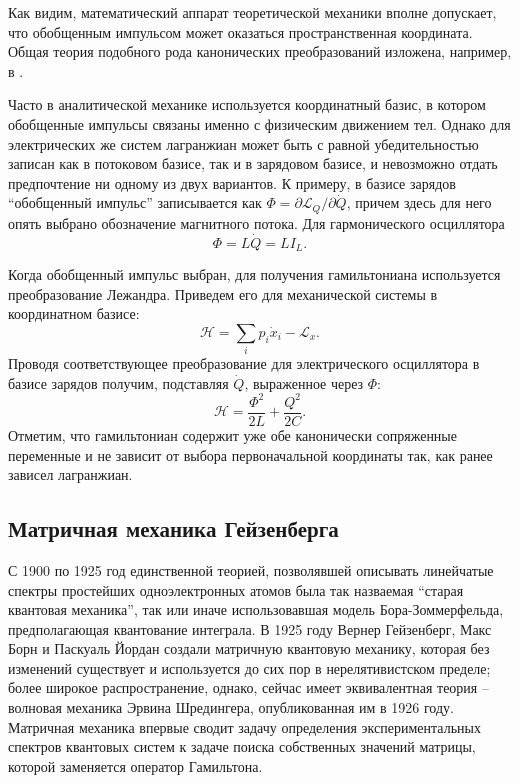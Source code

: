 \documentclass[14pt, a4paper]{extreport}
\numberwithin{equation}{section}
\begin{document}
Как видим, математический аппарат теоретической механики вполне допускает, что обобщенным импульсом может оказаться пространственная координата. Общая теория подобного рода канонических преобразований изложена, например, в \cite{shmutzer1976}.

Часто в аналитической механике используется координатный базис, в котором обобщенные импульсы связаны именно с физическим движением тел. Однако для электрических же систем лагранжиан может быть с равной убедительностью записан как в потоковом базисе, так и в зарядовом базисе, и невозможно отдать предпочтение ни одному из двух вариантов. К примеру, в базисе зарядов ``обобщенный импульс'' записывается как $\Phi = \partial \mathcal{L}_Q / \partial \dot Q$, причем здесь для него опять выбрано обозначение магнитного потока. Для гармонического осциллятора
\begin{equation}
	\Phi = L\dot Q = LI_L. \label{eq:Phi}
\end{equation}

Когда обобщенный импульс выбран, для получения гамильтониана используется преобразование Лежандра. Приведем его для механической системы в координатном базисе:
\begin{equation}
	\mathcal{H} = \sum_i p_i \dot x_i - \mathcal{L}_x.
\end{equation}
Проводя соответствующее преобразование для электрического осциллятора в базисе зарядов получим, подставляя $\dot Q$, выраженное через $\Phi$:
\begin{equation}
	\mathcal{H} = \frac{\Phi^2}{2 L} + \frac{Q^2}{2C}.\label{eq:planck_electric_osc}
\end{equation}
Отметим, что гамильтониан содержит уже обе канонически сопряженные переменные и не зависит от выбора первоначальной координаты так, как ранее зависел лагранжиан.

\subsection{Матричная механика Гейзенберга}

С 1900 по 1925 год единственной теорией, позволявшей описывать линейчатые спектры простейших одноэлектронных атомов была так назваемая ``старая квантовая механика'', так или иначе использовавшая модель Бора-Зоммерфельда, предполагающая квантование интеграла. В 1925 году Вернер Гейзенберг, Макс Борн и Паскуаль Йордан создали матричную квантовую механику, которая без изменений существует и используется до сих пор в нерелятивистском пределе; более широкое распространение, однако, сейчас имеет эквивалентная теория -- волновая механика Эрвина Шредингера, опубликованная им в 1926 году. Матричная механика впервые сводит задачу определения экспериментальных спектров квантовых систем к задаче поиска собственных значений матрицы, которой заменяется оператор Гамильтона. 
\end{document}
